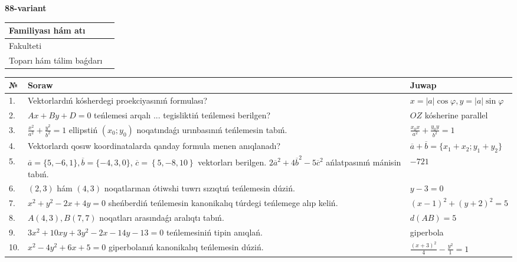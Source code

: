 \documentclass{article}
\begin{document}
\egroup

\newpage


\textbf{88-variant}\\

\bgroup
\def\arraystretch{1.6} %

\begin{tabular}{|m{5.7cm}|m{9.5cm}|}
\hline
Familiyası hám atı & \\
\hline
Fakulteti  & \\
\hline
Toparı hám tálim baǵdarı  & \\
\hline
\end{tabular}

\vspace{1cm}

\begin{tabular}{|m{0.7cm}|m{10cm}|m{4cm}|}
\hline
№ & Soraw & Juwap \\
\hline
1. & Vektorlardıń kósherdegi proekciyasınıń formulası? & $x=|a|\cos\varphi, y=|a|\sin\varphi$ \\
\hline
2. & $Ax+By+D=0$ teńlemesi arqalı ... tegisliktiń teńlemesi berilgen? & $OZ$ kósherine parallel \\
\hline
3. & $\frac{x^2}{a^2}+\frac{y^2}{b^2}=1$ ellipstiń $(x_0;y_0)$ noqatındaǵı urınbasınıń teńlemesin tabıń. & $\frac{x_0x}{a^2}+\frac{y_0y}{b^2}=1$ \\
\hline
4. & Vektorlardı qosıw koordinatalarda qanday formula menen anıqlanadı? & $\overline{a}+\overline{b}=\{x_1+x_2;y_1+y_2\}$ \\
\hline
5. & $\overline{a}=\{5,-6, 1 \}, \overline{b}=\{-4, 3, 0 \} $, $\overline{c}=\left\{ 5,-8, 10 \right\}$ vektorları berilgen. $2{\overline{a}}^{2}+4{\overline{b}}^{2}-5{\overline{c}}^{2}$ ańlatpasınıń mánisin tabıń. & $-721$ \\
\hline
6. & $(2, 3)$ hám $(4, 3)$ noqatlarınan ótiwshi tuwrı sızıqtıń teńlemesin dúziń. & $ y-3=0$ \\
\hline
7. & $x^{2}+y^{2}-2x+4y=0$ sheńberdiń teńlemesin kanonikalıq túrdegi teńlemege alıp keliń. & $(x-1)^{2}+(y+2)^{2}=5$ \\
\hline
8. & $A(4, 3), B(7, 7)$ noqatları arasındaǵı aralıqtı tabıń. & $d(AB)=5$ \\
\hline
9. & $3x^{2}+10xy+3y^{2}-2x-14y-13=0$ teńlemesiniń tipin anıqlań. & giperbola \\
\hline
10. & $x^{2}-4y^{2}+6x+5=0$ giperbolanıń kanonikalıq teńlemesin dúziń. & $\frac{(x+3)^{2}}{4}-\frac{y^{2}}{1}=1$ \\
\hline
\end{tabular}
\end{document}
